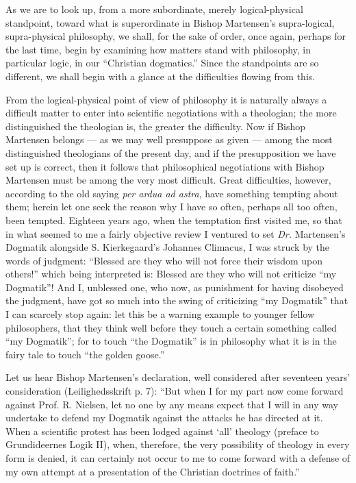 \documentclass[12pt]{book}
\newcommand{\opage}[1]{\marginnote{\footnotesize\textit{[#1]}}}
\begin{document}
As we are to look up, from a more subordinate, merely logical-physical standpoint, toward what is superordinate in Bishop Martensen's supra-logical, supra-physical philosophy, we shall, for the sake of order, once again, perhaps for the last time, begin by examining how matters stand with philosophy, in particular logic, in our ``Christian dogmatics.'' Since the standpoints are so different, we shall begin with a glance at the difficulties flowing from this.

From the logical-physical point of view of philosophy it is naturally always a difficult matter to enter into scientific negotiations with a theologian; the more distinguished the theologian is, the greater the difficulty. Now if Bishop Martensen belongs --- as we may well presuppose as given --- among the most distinguished theologians of the present day, and if the presupposition we have set up is correct, then it follows that philosophical negotiations with Bishop Martensen must be among the very most difficult. Great difficulties, however, according to the old saying \textit{per ardua ad astra}, have something tempting about them; herein let one seek the reason why I have so often, perhaps all too often, been tempted. Eighteen years ago, when the temptation first visited me, so that in what seemed to me a fairly objective review I ventured to set \textit{Dr.} Martensen's Dogmatik alongside S. Kierkegaard's Johannes Climacus, I was struck by the words of judgment: ``Blessed are they who will not force their wisdom upon others!'' which being interpreted is: Blessed are they who will not criticize ``my Dogmatik''! And I, unblessed one, who now, as punishment for having disobeyed the judgment, have got so much into the swing of criticizing ``my Dogmatik'' that I can scarcely stop again: let this be a warning
\opage{77}\setcounter{footnote}{0}%
example to younger fellow philosophers, that they think well before they touch a certain something called ``my Dogmatik''; for to touch ``the Dogmatik'' is in philosophy what it is in the fairy tale to touch ``the golden goose.''

Let us hear Bishop Martensen's declaration, well considered after seventeen years' consideration (Leilighedsskrift p. 7): ``But when I for my part now come forward against Prof. R. Nielsen, let no one by any means expect that I will in any way undertake to defend my Dogmatik against the attacks he has directed at it. When a scientific protest has been lodged against `all' theology (preface to Grundideernes Logik II), when, therefore, the very possibility of theology in every form is denied, it can certainly not occur to me to come forward with a defense of my own attempt at a presentation of the Christian doctrines of faith.''
\end{document}
